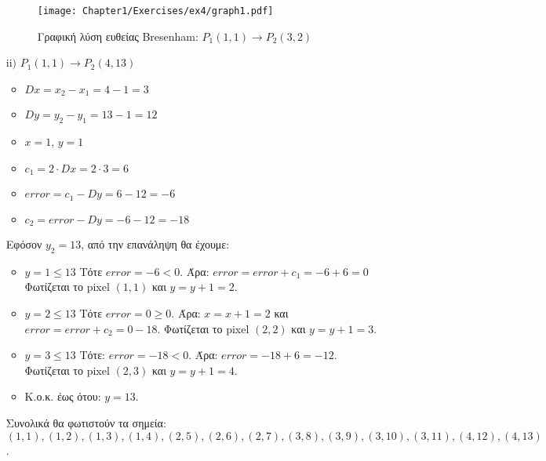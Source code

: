 \begin{solution}
\begin{enumerate}
\begin{figure}[hbt]
	\begin{center}
	\texttt{[image: Chapter1/Exercises/ex4/graph1.pdf]}
	\end{center}
\caption{Γραφική λύση ευθείας Bresenham: $P_1(1, 1) \to P_2(3, 2)$}
\end{figure}
    
\item[$\mathrm{ii)}$] $P_1(1, 1) \to P_2(4, 13)$
    

    \begin{itemize}
        \item $Dx = x_2 - x_1 = 4 - 1 = 3$
        \item $Dy = y_2 - y_1 = 13 - 1 = 12$
        \item $x = 1$, $y = 1$
        \item $c_1 = 2 \cdot Dx = 2 \cdot 3 = 6$
        \item $error = c_1 - Dy = 6 - 12 = -6$
        \item $c_2 = error - Dy = -6 - 12 = -18$
	\end{itemize}   
        
         
Εφόσον $y_2 = 13$, από την επανάληψη θα έχουμε:     
       
        \begin{itemize}
            \item \underline{$y = 1 \leq 13$} \newline 
            Τότε $error = -6 < 0$. Άρα: \newline 
			$error = error + c_1 = - 6 + 6 =0 $
            Φωτίζεται το pixel $(1,1)$ και $y = y+1 = 2$.
            
            \item \underline{$y = 2 \leq 13$} \newline 
            Τότε $error = 0 \geq 0$. Άρα: \newline 
            $x= x+1 = 2$ και $error = error + c_2 = 0 - 18$.
            Φωτίζεται το pixel $(2,2)$ και $y = y+1 = 3$.
            
            \item \underline{$y = 3 \leq 13$} \newline 
				 Tότε:  
            $error = -18 < 0$. Άρα: \newline  
            $error = -18 + 6 = -12$. 
            Φωτίζεται το pixel $(2,3)$ και $y = y+1 = 4$.
            \item Κ.ο.κ. έως ότου: $y = 13$.
        \end{itemize}
Συνολικά θα φωτιστούν τα σημεία: \newline  $(1, 1), (1, 2), (1, 3), (1, 4), (2, 5), (2, 6), (2, 7), (3, 8), (3, 9), (3, 10), (3, 11), (4, 12), (4, 13)$.
    

\end{enumerate}
\end{solution}
